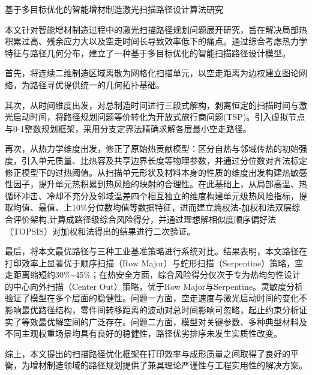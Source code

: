 \documentclass[a4paper, 12pt]{ctexart}
\newcommand{\sanhao}{\zihao{3}}
\newcommand{\sihao}{\zihao{4}}
\begin{document}
\cfoot{} 

\begin{center}
    {\sanhao\heiti 基于多目标优化的智能增材制造激光扫描路径设计算法研究} %
\end{center}

\vspace{1em}

\noindent{\sihao\heiti 摘\quad 要：}

本文针对智能增材制造过程中的激光扫描路径规划问题展开研究，旨在解决局部热积累过高、残余应力大以及空走时间长导致效率低下的痛点。通过综合考虑热力学特征与路径几何分布，建立了一种基于多目标优化的智能扫描路径设计模型。

首先，将连续二维制造区域离散为网格化扫描单元，以空走距离为边权建立图论网络，为路径寻优提供统一的几何拓扑基础。

其次，从时间维度出发，对总制造时间进行三段式解构，剥离恒定的扫描时间与激光启动时间，将路径规划问题等价转化为开放式旅行商问题(TSP)。引入虚拟节点与0-1整数规划框架，采用分支定界法精确求解各层最小空走路径。

再次，从热力学维度出发，修正了原始热贡献模型：区分自热与邻域传热的初始强度，引入单元质量、比热容及共享边界长度等物理参数，并通过分位数对齐法标定修正模型下的过热阈值。从扫描单元形状及材料本身的性质的维度出发构建热敏感性因子，提升单元热积累到热风险的映射的合理性。在此基础上，从局部高温、热循环冲击、冷却不充分及邻域温差四个相互独立的维度构建单元级热风险指标，提取均值、最值、上10\%分位数均值等数据特征，进而建立熵权法-加权和法双层综合评价架构,计算成路径级综合风险得分，并通过理想解相似度顺序偏好法（TOPSIS）对加权和法得出的结果进行二次验证。

最后，将本文最优路径与三种工业基准策略进行系统对比。结果表明，本文路径在打印效率上显著优于顺序扫描（Row Major）与蛇形扫描（Serpentine）策略，空走距离缩短约30\%\textasciitilde45\%；在热安全方面，综合风险得分仅次于专为热均匀性设计的中心向外扫描（Center Out）策略，优于Row Major与Serpentine。灵敏度分析验证了模型在多个层面的稳健性。问题一方面，空走速度与激光启动时间的变化不影响最优路径结构，零件间转移距离的波动对总时间影响可忽略，起止约束分析证实了等效最优解空间的广泛存在。问题二方面，模型对关键参数、多种典型材料及不同主观权重场景均具有良好的稳健性，路径优劣排序未发生实质性改变。

综上，本文提出的扫描路径优化框架在打印效率与成形质量之间取得了良好的平衡，为增材制造领域的路径规划提供了兼具理论严谨性与工程实用性的解决方案。
\end{document}
